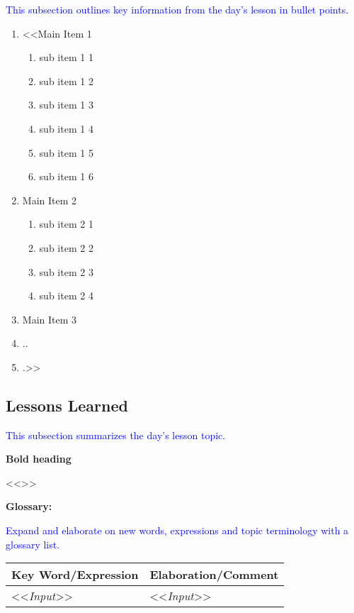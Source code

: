 {{\textcolor{blue}{This subsection outlines key information from the day's lesson in bullet points.}}

\begin{enumerate}\itshape
    \item <<Main Item 1
    \begin{enumerate}
        \item sub item 1 1
        \item sub item 1 2
        \item sub item 1 3
        \item sub item 1 4
        \item sub item 1 5
        \item sub item 1 6
    \end{enumerate}
    \item Main Item 2
    \begin{enumerate}
        \item sub item 2 1
        \item sub item 2 2
        \item sub item 2 3
        \item sub item 2 4
    \end{enumerate}
    \item Main Item 3
    \item ..
    \item .>>
\end{enumerate}


\subsection{Lessons Learned}

{\textcolor{blue}{This subsection summarizes the day's lesson topic.}}

{\bfseries{Bold heading}}

<<{\emph{\blindtext[2]}}>>


{\bfseries{Glossary:}}

{\textcolor{blue}{Expand and elaborate on new words, expressions and topic terminology with a glossary list.}}

\begin{table}[H]\label{tab:glossary}
    \begin{tabular}{p{40mm} | p{120mm}}
        {\bfseries{Key Word/Expression}} & {\bfseries{Elaboration/Comment}}\\ \hline
        <<{\emph{Input}}>> & <<{\emph{Input}}>>\\ \hline
    \end{tabular}
\end{table}

}
